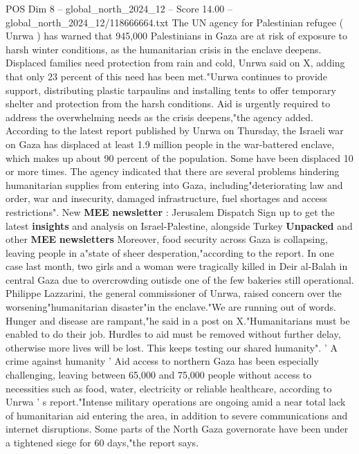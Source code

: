 \begin{textsample}{POS Dim 8 – global\_north\_2024\_12 – Score 14.00 – global\_north\_2024\_12/118666664.txt}  \label{ex:f8_pos_093}
The UN agency for Palestinian refugee ( Unrwa ) has warned that 945,000 Palestinians in Gaza are at risk of exposure to harsh winter conditions, as the humanitarian crisis in the enclave deepens.
Displaced families need protection from rain and cold, Unrwa said on X, adding that only 23 percent of this need has been met."Unrwa continues to provide support, distributing plastic tarpaulins and installing tents to offer temporary shelter and protection from the harsh conditions.
Aid is urgently required to address the overwhelming needs as the crisis deepens,"the agency added.
According to the latest report published by Unrwa on Thursday, the Israeli war on Gaza has displaced at least 1.9 million people in the war-battered enclave, which makes up about 90 percent of the population.
Some have been displaced 10 or more times.
The agency indicated that there are several problems hindering humanitarian supplies from entering into Gaza, including"deteriorating law and order, war and insecurity, damaged infrastructure, fuel shortages and access restrictions".
New \textbf{MEE} \textbf{newsletter} : Jerusalem Dispatch Sign up to get the latest \textbf{insights} and analysis on Israel-Palestine, alongside Turkey \textbf{Unpacked} and other \textbf{MEE} \textbf{newsletters} Moreover, food security across Gaza is collapsing, leaving people in a"state of sheer desperation,"according to the report.
In one case last month, two girls and a woman were tragically killed in Deir al-Balah in central Gaza due to overcrowding outisde one of the few bakeries still operational.
Philippe Lazzarini, the general commissioner of Unrwa, raised concern over the worsening"humanitarian disaster"in the enclave."We are running out of words.
Hunger and disease are rampant,"he said in a post on X."Humanitarians must be enabled to do their job.
Hurdles to aid must be removed without further delay, otherwise more lives will be lost.
This keeps testing our shared humanity". ' A crime against humanity ' Aid access to northern Gaza has been especially challenging, leaving between 65,000 and 75,000 people without access to necessities such as food, water, electricity or reliable healthcare, according to Unrwa ' s report."Intense military operations are ongoing amid a near total lack of humanitarian aid entering the area, in addition to severe communications and internet disruptions.
Some parts of the North Gaza governorate have been under a tightened siege for 60 days,"the report says.

\end{textsample}
